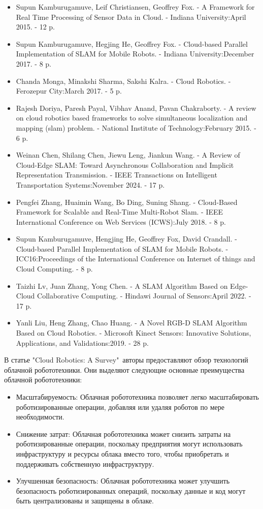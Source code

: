 \documentclass[a4paper, 14pt]{extreport}
\begin{document}
\begin{itemize}
        \item Supun Kamburugamuve, Leif Christiansen, Geoffrey Fox. - A Framework for Real Time Processing of Sensor Data in Cloud. - Indiana University:April 2015. - 12 p.
        \item Supun Kamburugamuve, Hegjing He, Geoffrey Fox. - Cloud-based Parallel \linebreak Implementation of SLAM for Mobile Robots. - Indiana University:December 2017. - 8 p.
        \item Chanda Monga, Minakshi Sharma, Sakshi Kalra. - Cloud Robotics. - Ferozepur City:March 2017. - 5 p.
        \item Rajesh Doriya, Paresh Payal, Vibhav Anand, Pavan Chakraborty. - A review on cloud robotics based frameworks to solve simultaneous localization and mapping (slam) problem. - National Institute of Technology:February 2015. - 6 p.
        \item Weinan Chen, Shilang Chen, Jiewu Leng, Jiankun Wang. - A Review of Cloud-Edge SLAM: Toward Asynchronous Collaboration and Implicit Representation Transmission. - IEEE Transactions on Intelligent Transportation Systems:November 2024. - 17 p. 
        \item Pengfei Zhang, Huaimin Wang, Bo Ding, Suning Shang. - Cloud-Based Framework for Scalable and Real-Time Multi-Robot Slam. - IEEE International Conference on Web Services (ICWS):July 2018. - 8 p.
        \item Supun Kamburugamuve, Hengjing He, Geoffrey Fox, David Crandall. - Cloud-based Parallel Implementation of SLAM for Mobile Robots. - ICC16:Proceedings of the International Conference on Internet of things and Cloud Computing. - 8 p.
        \item Taizhi Lv, Juan Zhang, Yong Chen. - A SLAM Algorithm Based on Edge-Cloud Collaborative Computing. - Hindawi Journal of Sensors:April 2022. - 17 p.
        \item Yanli Liu, Heng Zhang, Chao Huang. - A Novel RGB-D SLAM Algorithm Based on Cloud Robotics. - Microsoft Kinect Sensors: Innovative Solutions, Applications, and Validations:2019. - 28 p.
\end{itemize}
\par\noindent В статье "Cloud Robotics: A Survey"\ авторы предоставляют обзор технологий облачной робототехники. Они выделяют следующие основные преимущества облачной робототехники:
\begin{itemize}
        \item Масштабируемость: Облачная робототехника позволяет легко масштабировать роботизированные операции, добавляя или удаляя роботов по мере необходимости.
        \item Снижение затрат: Облачная робототехника может снизить затраты на роботизированные операции, поскольку предприятия могут использовать инфраструктуру и ресурсы облака вместо того, чтобы приобретать и поддерживать собственную инфраструктуру.
        \item Улучшенная безопасность: Облачная робототехника может улучшить безопасность роботизированных операций, поскольку данные и код могут быть централизованы и защищены в облаке.
\end{itemize}
\end{document}
